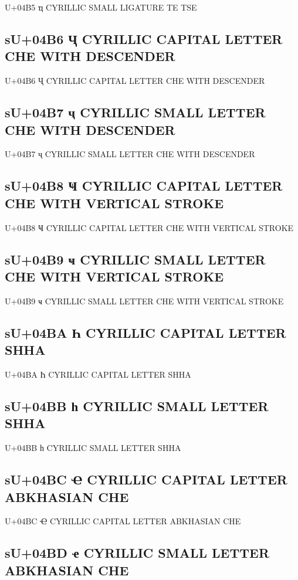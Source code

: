 U+04B5 ҵ  CYRILLIC SMALL LIGATURE TE TSE

\subsection{sU+04B6 Ҷ  CYRILLIC CAPITAL LETTER CHE WITH DESCENDER}

U+04B6 Ҷ  CYRILLIC CAPITAL LETTER CHE WITH DESCENDER

\subsection{sU+04B7 ҷ  CYRILLIC SMALL LETTER CHE WITH DESCENDER}

U+04B7 ҷ  CYRILLIC SMALL LETTER CHE WITH DESCENDER

\subsection{sU+04B8 Ҹ  CYRILLIC CAPITAL LETTER CHE WITH VERTICAL STROKE}

U+04B8 Ҹ  CYRILLIC CAPITAL LETTER CHE WITH VERTICAL STROKE

\subsection{sU+04B9 ҹ  CYRILLIC SMALL LETTER CHE WITH VERTICAL STROKE}

U+04B9 ҹ  CYRILLIC SMALL LETTER CHE WITH VERTICAL STROKE

\subsection{sU+04BA Һ  CYRILLIC CAPITAL LETTER SHHA}

U+04BA Һ  CYRILLIC CAPITAL LETTER SHHA

\subsection{sU+04BB һ  CYRILLIC SMALL LETTER SHHA}

U+04BB һ  CYRILLIC SMALL LETTER SHHA

\subsection{sU+04BC Ҽ  CYRILLIC CAPITAL LETTER ABKHASIAN CHE}

U+04BC Ҽ  CYRILLIC CAPITAL LETTER ABKHASIAN CHE

\subsection{sU+04BD ҽ  CYRILLIC SMALL LETTER ABKHASIAN CHE}

